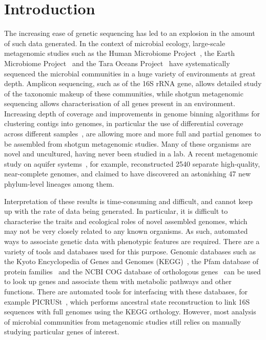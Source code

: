 \documentclass[10pt,letterpaper]{article}
\begin{document}
\section*{Introduction}
The increasing ease of genetic sequencing has led to an explosion in the amount of such data generated. In the context of microbial ecology, large-scale metagenomic studies such as the Human Microbiome Project~\cite{Huttenhower2012}, the Earth Microbiome Project~\cite{Gilbert2014} and the Tara Oceans Project~\cite{Zhang2015} have systematically sequenced the microbial communities in a huge variety of environments at great depth. Amplicon sequencing, such as of the 16S rRNA gene, allows detailed study of the taxonomic makeup of these communities, while shotgun metagenomic sequencing allows characterisation of all genes present in an environment. Increasing depth of coverage and improvements in genome binning algorithms for clustering contigs into genomes, in particular the use of differential coverage across different samples~\cite{Alneberg2014, Eren2015}, are allowing more and more full and partial genomes to be assembled from shotgun metagenomic studies. Many of these organisms are novel and uncultured, having never been studied in a lab. A recent metagenomic study on aquifer systems~\cite{Anantharaman2016}, for example, reconstructed 2540 separate high-quality, near-complete genomes, and claimed to have discovered an astonishing 47 new phylum-level lineages among them.

Interpretation of these results is time-consuming and difficult, and cannot keep up with the rate of data being generated. In particular, it is difficult to characterise the traits and ecological roles of novel assembled genomes, which may not be very closely related to any known organisms. As such, automated ways to associate genetic data with phenotypic features are required. There are a variety of tools and databases used for this purpose. Genomic databases such as the Kyoto Encyclopedia of Genes and Genomes (KEGG)~\cite{Kanehisa2017}, the Pfam database of protein families~\cite{Finn2016} and the NCBI COG database of orthologous genes~\cite{Tatusov1997} can be used to look up genes and associate them with metabolic pathways and other functions. There are automated tools for interfacing with these databases, for example PICRUSt~\cite{Langille2013}, which performs ancestral state reconstruction to link 16S sequences with full genomes using the KEGG orthology. However, most analysis of microbial communities from metagenomic studies still relies on manually studying particular genes of interest.
\end{document}
